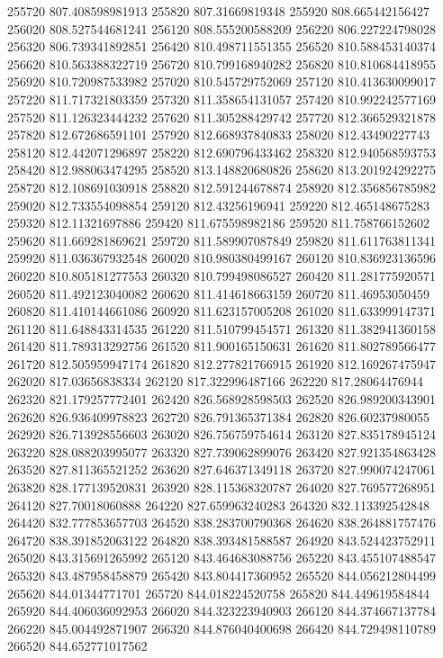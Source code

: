 {255720 807.408598981913
255820 807.31669819348
255920 808.665442156427
256020 808.527544681241
256120 808.555200588209
256220 806.227224798028
256320 806.739341892851
256420 810.498711551355
256520 810.588453140374
256620 810.563388322719
256720 810.799168940282
256820 810.810684418955
256920 810.720987533982
257020 810.545729752069
257120 810.413630099017
257220 811.717321803359
257320 811.358654131057
257420 810.992242577169
257520 811.126323444232
257620 811.305288429742
257720 812.366529321878
257820 812.672686591101
257920 812.668937840833
258020 812.43490227743
258120 812.442071296897
258220 812.690796433462
258320 812.940568593753
258420 812.988063474295
258520 813.148820680826
258620 813.201924292275
258720 812.108691030918
258820 812.591244678874
258920 812.356856785982
259020 812.733554098854
259120 812.43256196941
259220 812.465148675283
259320 812.11321697886
259420 811.675598982186
259520 811.758766152602
259620 811.669281869621
259720 811.589907087849
259820 811.611763811341
259920 811.036367932548
260020 810.980380499167
260120 810.836923136596
260220 810.805181277553
260320 810.799498086527
260420 811.281775920571
260520 811.492123040082
260620 811.414618663159
260720 811.46953050459
260820 811.410144661086
260920 811.623157005208
261020 811.633999147371
261120 811.648843314535
261220 811.510799454571
261320 811.382941360158
261420 811.789313292756
261520 811.900165150631
261620 811.802789566477
261720 812.505959947174
261820 812.277821766915
261920 812.169267475947
262020 817.03656838334
262120 817.322996487166
262220 817.28064476944
262320 821.179257772401
262420 826.568928598503
262520 826.989200343901
262620 826.936409978823
262720 826.791365371384
262820 826.60237980055
262920 826.713928556603
263020 826.756759754614
263120 827.835178945124
263220 828.088203995077
263320 827.739062899076
263420 827.921354863428
263520 827.811365521252
263620 827.646371349118
263720 827.990074247061
263820 828.177139520831
263920 828.115368320787
264020 827.769577268951
264120 827.70018060888
264220 827.659963240283
264320 832.113392542848
264420 832.777853657703
264520 838.283700790368
264620 838.264881757476
264720 838.391852063122
264820 838.393481588587
264920 843.524423752911
265020 843.315691265992
265120 843.464683088756
265220 843.455107488547
265320 843.487958458879
265420 843.804417360952
265520 844.056212804499
265620 844.01344771701
265720 844.018224520758
265820 844.449619584844
265920 844.406036092953
266020 844.323223940903
266120 844.374667137784
266220 845.004492871907
266320 844.876040400698
266420 844.729498110789
266520 844.652771017562
}
